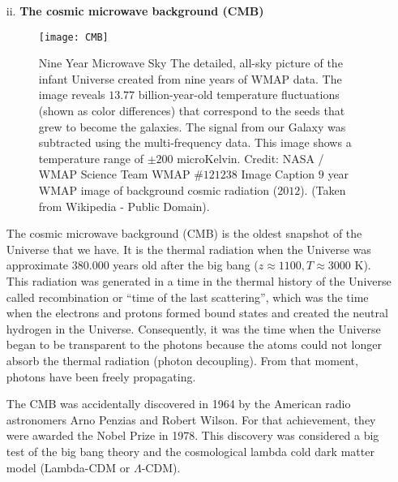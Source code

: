\begin{itemize}
\item[ii.] \textbf{The cosmic microwave background (CMB) }

\begin{figure}[h]
\begin{center}
\texttt{[image: CMB]}
\end{center}
\caption{Nine Year Microwave Sky The detailed, all-sky picture of the infant Universe created from nine years of WMAP data. The image reveals $13.77$ billion-year-old temperature fluctuations (shown as color differences) that correspond to the seeds that grew to become the galaxies. The signal from our Galaxy was subtracted using the multi-frequency data. This image shows a temperature range of $\pm 200$ microKelvin. Credit: NASA / WMAP Science Team WMAP $\# 121238$ Image Caption $9$ year WMAP image of background cosmic radiation ($2012$).  (Taken from Wikipedia - Public Domain).}
\label{fig:CMB}
\end{figure}

The cosmic microwave background (CMB) is the oldest snapshot of the Universe that we have.
It is the thermal radiation when the Universe was approximate  $380.000$ years old after the big bang ($z\approx 1100, T\approx 3000$ K).
This radiation was generated in a time in the thermal history of the Universe called recombination or ``time of the last scattering'', which was the time when the electrons and protons formed bound states and created the neutral hydrogen in the Universe. Consequently, it was the time when the Universe began to be transparent to the photons because the atoms could not longer absorb the thermal radiation (photon decoupling). From that moment,  photons have been freely propagating.

The CMB was accidentally discovered in 1964 by the American radio astronomers Arno Penzias and Robert Wilson. For that achievement, they were awarded the Nobel Prize in 1978. This discovery was considered a big test of the big bang theory and the cosmological lambda cold dark matter model (Lambda-CDM or $\Lambda$-CDM).


\end{itemize}
